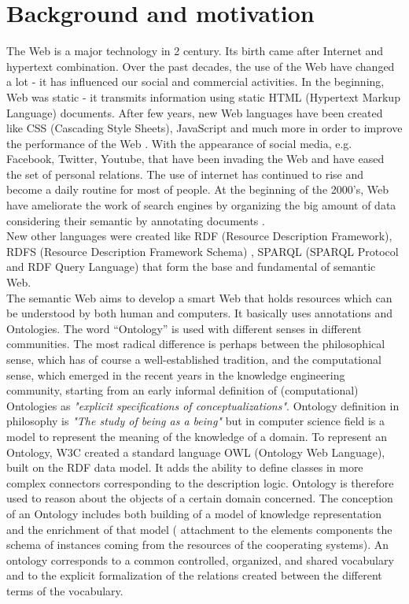 \chapter*{Background and motivation}
\label{Intro}
 
\lettrine[lines=3,loversize=0.5]{T}{}he Web is a major technology in 2 century. Its birth came after Internet and hypertext combination. Over the past decades, the use of the Web have changed a lot - it has influenced our social and commercial activities. In the beginning, Web was static - it transmits information using static HTML (Hypertext Markup Language) documents. After few years, new Web languages have been created like CSS (Cascading Style Sheets), JavaScript and much more in order to improve the performance of the Web .
With the appearance of social media, e.g. Facebook, Twitter, Youtube, that have been invading the Web and have eased the set of personal relations. The use of internet has continued to rise and become a daily routine for most of people.
At the beginning of the 2000's, Web have ameliorate the work of search engines by organizing the big amount of data considering their semantic by annotating documents .\\
New other languages were created like RDF (Resource Description Framework), RDFS (Resource Description Framework Schema)
, SPARQL (SPARQL Protocol and RDF Query Language) that form the base and fundamental of semantic Web.\\



The semantic Web aims to develop a smart Web that holds resources which can be understood by both human and computers. It basically uses annotations and Ontologies. The word “Ontology” is used with different senses in different communities. The most radical difference is perhaps between the philosophical sense, which has of course a well-established tradition, and the computational sense, which emerged in the recent years in the knowledge engineering community, starting from an early informal definition of (computational) Ontologies as \textit{"explicit specifications of conceptualizations"}. Ontology definition in philosophy is \textit{"The study of being as a being"} but in computer science field is a model to represent the meaning of the knowledge of a domain. To represent an Ontology, W3C created a standard language OWL (Ontology Web Language), built on the RDF data model. It adds the ability to define classes in more complex connectors corresponding to the description logic. Ontology is therefore used to reason about the objects of a certain domain concerned.
The conception of an Ontology includes both building of a model of knowledge representation and the enrichment of that model (
attachment to the elements components the schema of instances coming from the resources of the cooperating systems). An ontology corresponds to a common controlled, organized, and shared vocabulary and to the explicit formalization of the relations created between the different terms of the vocabulary.\\

